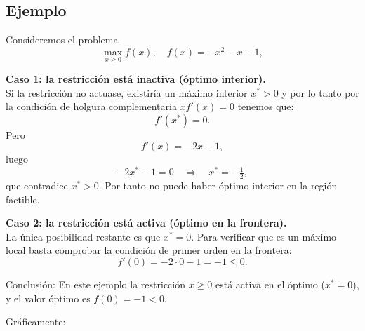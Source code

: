 \documentclass{article}
\begin{document}
\subsection*{Ejemplo}

Consideremos el problema
\[
\max_{x\ge0}f(x),
\quad
f(x) = -x^2 - x - 1,
\]


\textbf{Caso 1: la restricción está inactiva (óptimo interior).}\\
Si la restricción no actuase, existiría un máximo interior \(x^*>0\) y por lo tanto por la condición de holgura complementaria $x f'(x)=0$ tenemos que:
\[
f'(x^*) = 0.
\]
Pero
\[
f'(x) = -2x - 1,
\]
luego
\[
-2x^* - 1 = 0
\quad\Longrightarrow\quad
x^* = -\tfrac12,
\]
que contradice \(x^*>0\). Por tanto no puede haber óptimo interior en la región factible.

\medskip

\textbf{Caso 2: la restricción está activa (óptimo en la frontera).}\\
La única posibilidad restante es que \(x^*=0\). Para verificar que es un máximo local basta comprobar la condición de primer orden en la frontera:
\[
f'(0) = -2\cdot 0 - 1 = -1 \le 0.
\]

{\color{teal}Conclusión: En este ejemplo la restricción \(x\ge0\) está activa en el óptimo (\(x^*=0\)), y el valor óptimo es \(f(0)=-1<0\).}

Gráficamente:
\begin{center}
\end{center}
\end{document}
